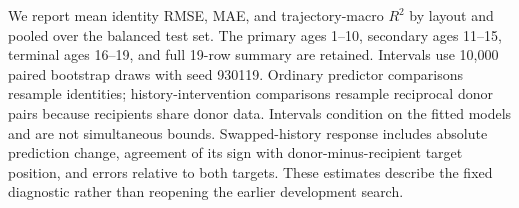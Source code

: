 We report mean identity RMSE, MAE, and trajectory-macro $R^2$ by layout and pooled over the balanced test set. The primary ages 1--10, secondary ages 11--15, terminal ages 16--19, and full 19-row summary are retained. Intervals use 10,000 paired bootstrap draws with seed 930119. Ordinary predictor comparisons resample identities; history-intervention comparisons resample reciprocal donor pairs because recipients share donor data. Intervals condition on the fitted models and are not simultaneous bounds. Swapped-history response includes absolute prediction change, agreement of its sign with donor-minus-recipient target position, and errors relative to both targets. These estimates describe the fixed diagnostic rather than reopening the earlier development search.
